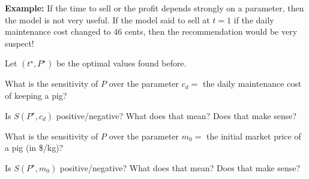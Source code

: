 

\begin{slide}


\textbf{Example:} If the time to sell or the profit depends strongly on a parameter, then the model is not very useful.
If the model said to sell at $t=1$ if the daily maintenance cost changed to 46 cents, then the recommendation would be very suspect!

\begin{parts}
\setcounter{partsitem}{4}

	\item Let $(t^\star,P^\star)$ be the optimal values found before. 
	
	What is the sensitivity of $P$ over the parameter $c_d=$ the daily maintenance cost of keeping a pig?
	
	\item Is $S(P^\star,c_d)$ positive/negative? What does that mean? Does that make sense?
	
	\item What is the sensitivity of $P$ over the parameter $m_0=$ the initial market price of a pig (in \$/kg)?

	\item Is $S(P^\star,m_0)$ positive/negative? What does that mean? Does that make sense?

\end{parts}

\end{slide}



